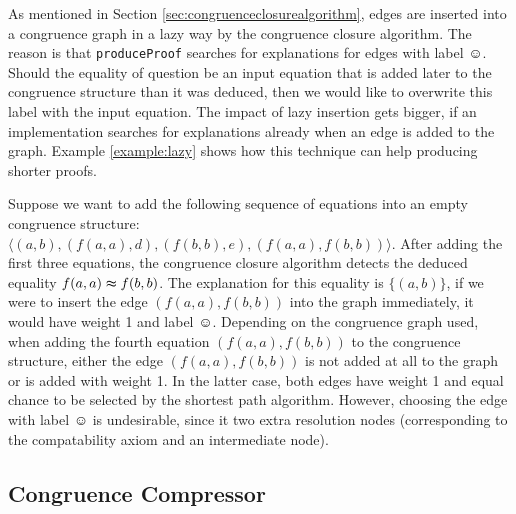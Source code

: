 As mentioned in Section \ref{sec:congruenceclosurealgorithm}, edges are inserted into a congruence graph in a lazy way by the congruence closure algorithm.
The reason is that \texttt{produceProof} searches for explanations for edges with label $\smiley$.
Should the equality of question be an input equation that is added later to the congruence structure than it was deduced, then we would like to overwrite this label with the input equation.
The impact of lazy insertion gets bigger, if an implementation searches for explanations already when an edge is added to the graph.
Example \ref{example:lazy} shows how this technique can help producing shorter proofs.

\begin{example}
\label{example:lazy}
Suppose we want to add the following sequence of equations into an empty congruence structure: $\langle (a,b),(f(a,a),d),(f(b,b),e),(f(a,a),f(b,b)) \rangle$.
After adding the first three equations, the congruence closure algorithm detects the deduced equality $f(a,a) \thickapprox f(b,b)$.
The explanation for this equality is $\{(a,b)\}$, if we were to insert the edge $(f(a,a),f(b,b))$ into the graph immediately, it would have weight 1 and label $\smiley$.
Depending on the congruence graph used, when adding the fourth equation $(f(a,a),f(b,b))$ to the congruence structure, either the edge $(f(a,a),f(b,b))$ is not added at all to the graph or is added with weight 1.
In the latter case, both edges have weight 1 and equal chance to be selected by the shortest path algorithm.
However, choosing the edge with label $\smiley$ is undesirable, since it two extra resolution nodes (corresponding to the compatability axiom and an intermediate node).

\end{example}

\FloatBarrier

\subsection*{Congruence Compressor}

